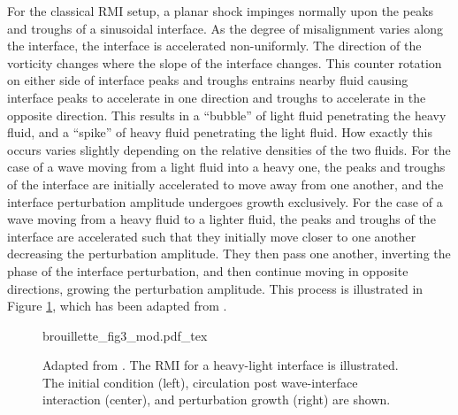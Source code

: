 For the classical \ac{RMI} setup, a planar shock impinges normally
upon the peaks and troughs of a sinusoidal interface. As the degree of
misalignment varies along the interface, the interface is accelerated
non-uniformly. The direction of the vorticity changes where the
slope of the interface changes. This counter rotation on either side
of interface peaks and troughs entrains nearby fluid causing interface
peaks to accelerate in one direction and troughs to accelerate in the
opposite direction. This results in a ``bubble'' of light fluid
penetrating the heavy fluid, and a ``spike'' of heavy fluid
penetrating the light fluid. How exactly this occurs varies slightly
depending on the relative densities of the two fluids. For the case of
a wave moving from a light fluid into a heavy one, the peaks and
troughs of the interface are initially accelerated to move away from
one another, and the interface perturbation amplitude undergoes growth
exclusively. For the case of a wave moving from a heavy fluid to a
lighter fluid, the peaks and troughs of the interface are accelerated
such that they initially move closer to one another decreasing the
perturbation amplitude. They then pass one another, inverting the
phase of the interface perturbation, and then continue moving in
opposite directions, growing the perturbation amplitude. This process
is illustrated in Figure \ref{fig:rmi_schematic}, which has been
adapted from \cite{Brouillette2002}.
\begin{figure}
  \centering
  \def\svgwidth{0.9\textwidth}
  {brouillette_fig3_mod.pdf_tex} \hfill%
  \caption[A schematic view of the \ac{RMI} instability for a
  heavy-light interface]{Adapted from \cite{Brouillette2002}. The
    \ac{RMI} for a heavy-light interface is illustrated. The initial
    condition (left), circulation post wave-interface interaction
    (center), and perturbation growth (right) are shown.}
  \label{fig:rmi_schematic}
\end{figure}

